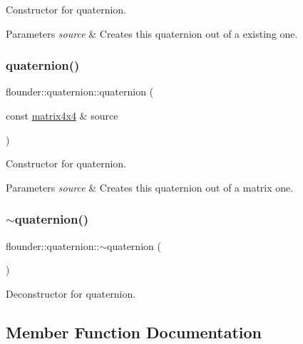 Constructor for quaternion. 


\begin{DoxyParams}{Parameters}
{\em source} & Creates this quaternion out of a existing one. \\
\hline
\end{DoxyParams}
\mbox{\label{classflounder_1_1quaternion_a33068d946a6728158f00da62d7288639}} 
\subsubsection{\texorpdfstring{quaternion()}{quaternion()}\hspace{0.1cm}{\footnotesize\ttfamily [4/4]}}
{\footnotesize\ttfamily flounder\+::quaternion\+::quaternion (\begin{DoxyParamCaption}\item[{const \hyperlink{classflounder_1_1matrix4x4}{matrix4x4} \&}]{source }\end{DoxyParamCaption})}



Constructor for quaternion. 


\begin{DoxyParams}{Parameters}
{\em source} & Creates this quaternion out of a matrix one. \\
\hline
\end{DoxyParams}
\mbox{\label{classflounder_1_1quaternion_a08ebd87c25488f0a7aff8521e2d56eb9}} 
\subsubsection{\texorpdfstring{$\sim$quaternion()}{~quaternion()}}
{\footnotesize\ttfamily flounder\+::quaternion\+::$\sim$quaternion (\begin{DoxyParamCaption}{ }\end{DoxyParamCaption})}



Deconstructor for quaternion. 



\subsection{Member Function Documentation}
\mbox{\label{classflounder_1_1quaternion_ab9b9a5ba36c73f887d86c7802860cb60}} 
